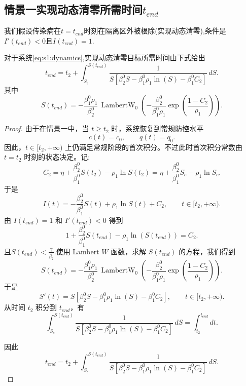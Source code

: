 \documentclass[lang=cn,a4paper,newtx]{elegantpaper}
\numberwithin{equation}{section}
\theoremstyle{plain}
\begin{document}
\subsection{情景一实现动态清零所需时间$t_{end}$}
我们假设传染病在$t=t_{end}$时刻在隔离区外被根除(实现动态清零),条件是$I'(t_{end})<0$且$I(t_{end})=1$.
\begin{theorem}\label{thm:s1:tend}
    对于系统\eqref{eq:s1:dynamics},实现动态清零目标所需时间由下式给出
    \[
    t_{end}=t_2+\int_{S_c}^{S(t_{end})}\frac{1}
    {S\left[\beta_2^0 S-\beta_1^0 \rho_1 \ln(S)-
    \beta_1^0 C_2\right]}\, dS .
    \]
    其中
    \begin{equation}
    S(t_{end})=
    -\frac{\beta_1^0 \rho_1}{\beta_2^0}\,
    \operatorname{LambertW}_0
    \left(
    -\frac{\beta_2^0}{\beta_1^0 \rho_1}
    \exp\left(
    \frac{1-C_2}{\rho_1}
    \right)
    \right).
    \label{eq:s1:Send}
    \end{equation}
\end{theorem}
\begin{proof}
    由于在情景一中，当 $t\ge t_2$ 时，系统恢复到常规防控水平
    \[
    c(t)=c_0,\qquad q(t)=q_0.
    \]
    因此，$t\in[t_2,+\infty)$ 上仍满足常规阶段的首次积分。不过此时首次积分常数由
    $t=t_2$ 时刻的状态决定。记:
    \[
    C_2=\eta+\frac{\beta_2^0}{\beta_1^0}S(t_2)-\rho_1\ln S(t_2)=\eta+\frac{\beta_2^0}{\beta_1^0}S_c-\rho_1\ln S_c.
    \]
    于是
    \[
    I(t)
    =
    -\frac{\beta_2^0}{\beta_1^0} S(t)
    +
    \rho_1 \ln S(t)
    +
    C_2,
    \qquad
    t \in [t_2,+\infty).
    \]
    由 $I(t_{end})=1$ 和 $I'(t_{end})<0$ 得到
    \[
    1
    +
    \frac{\beta_2^0}{\beta_1^0} S(t_{end})
    -
    \rho_1 \ln(S(t_{end}))
    =
    C_2 .
    \]
    且$S(t_{end}) < \frac{\gamma}{\beta_2^0}$.使用 Lambert $W$ 函数，求解 $S(t_{end})$ 的方程，我们得到
    \[
    S(t_{end})=
    -\frac{\beta_1^0 \rho_1}{\beta_2^0}\,
    \operatorname{LambertW}_0
    \left(
    -\frac{\beta_2^0}{\beta_1^0 \rho_1}
    \exp\left(
    \frac{1-C_2}{\rho_1}
    \right)
    \right).
    \]
    于是
    \[
    S'(t)=S\left[\beta_2^0 S-
    \beta_1^0 \rho_1 \ln(S)
    -\beta_1^0 C_2
    \right],
    \qquad
    t \in [t_2,+\infty).
    \]
    从时间 $t_2$ 积分到 $t_{end}$，有
    \[
    \int_{S_c}^{S(t_{end})}
    \frac{1}
    {
    S\left[
    \beta_2^0 S
    -
    \beta_1^0 \rho_1 \ln(S)
    -
    \beta_1^0 C_2
    \right]
    }
    \, dS
    =
    \int_{t_2}^{t_{end}} dt .
    \]

    因此
    \[
    t_{end}=t_2+\int_{S_c}^{S(t_{end})}\frac{1}
    {S\left[\beta_2^0 S-\beta_1^0 \rho_1 \ln(S)-
    \beta_1^0 C_2\right]}\, dS .
    \]
\end{proof}
\end{document}
